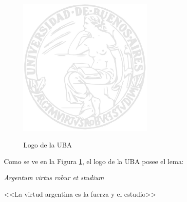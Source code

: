 \documentclass{article}
\begin{document}
\begin{figure}[h]
  \centering
  \caption{Logo de la UBA}
  \includegraphics[width=0.6\textwidth]{logo_uba}
  \label{fig:logo_uba}
\end{figure}

Como se ve en la Figura \ref{fig:logo_uba}, el logo de la UBA posee el lema:

\begin{center}
  \textit{Argentum virtus robur et studium}

  <<La virtud argentina es la fuerza y el estudio>>
\end{center}

\listoffigures
\end{document}
